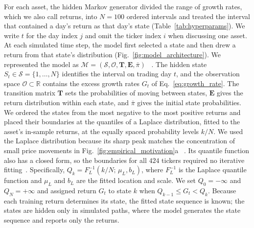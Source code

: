 

For each asset, the hidden Markov generator divided the range of growth rates, which we also call returns, into $N=100$ ordered intervals and treated the interval that contained a day's
return as that day's state (Table~\ref{tab:hyperparams}). We write
$t$ for the day index $j$ and omit the ticker index $i$ when
discussing one asset. At each simulated time step, the model
first selected a state and then drew a return from that state's
distribution (Fig.~\ref{fig:model_architecture}). We represented the
model as
$\mathcal{M} = (\mathcal{S}, \mathcal{O}, \mathbf{T}, \mathbf{E}, \bar{\pi})$
~\cite{rabinerJuang1986}.
The hidden state $S_t \in \mathcal{S} = \{1,\dots,N\}$ identifies the
interval on trading day $t$, and the observation space
$\mathcal{O}\subset\mathbb{R}$ contains the excess growth rates $G_t$
of Eq.~\eqref{eq:growth_rate}. The transition
matrix $\mathbf{T}$ sets the probabilities of moving between states,
$\mathbf{E}$ gives the return distribution within each state, and
$\bar{\pi}$ gives the initial state probabilities. We ordered the
states from the most negative to the most positive returns and placed their boundaries at the quantiles of a Laplace distribution,
fitted to the asset's in-sample returns, at the equally spaced
probability levels $k/N$. We used the Laplace
distribution because its sharp peak matches the concentration of
small price movements in Fig.~\ref{fig:empirical_motivation}a
~\cite{kotzKozubowskiPodgorski2001, tothJones2019}. Its quantile
function also has a closed form, so the boundaries for all $424$
tickers required no iterative fitting~\cite{bilmes1998}. Specifically,
$Q_k = F_L^{-1}(k/N;\, \mu_L, b_L)$, where $F_L^{-1}$ is the Laplace
quantile function and $\mu_L$ and $b_L$ are the fitted location and
scale. We set $Q_0=-\infty$ and $Q_N=+\infty$ and assigned return
$G_t$ to state $k$ when $Q_{k-1}\le G_t<Q_k$. Because each training
return determines its state, the fitted state sequence is known; the
states are hidden only in simulated paths, where the model generates
the state sequence and reports only the returns.

